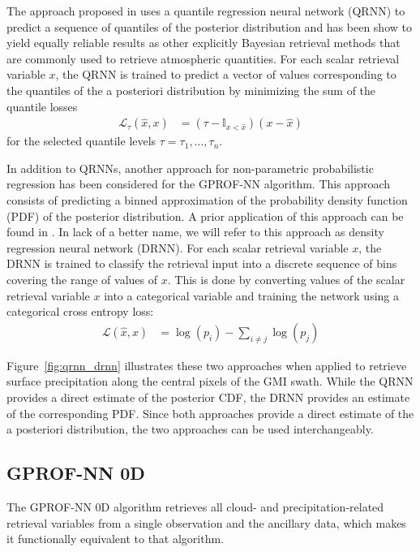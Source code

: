 \documentclass[a4paper,11pt,bibtotoc]{scrartcl}
\begin{document}
The approach proposed in \citet{pfreundschuh18} uses a quantile regression
neural network (QRNN) to predict a sequence of quantiles of the posterior
distribution and has been show to yield equally reliable results as other
explicitly Bayesian retrieval methods that are commonly used to retrieve
atmospheric quantities. For each scalar retrieval variable $x$, the QRNN is
trained to predict a vector of values corresponding to the quantiles of the a
posteriori distribution by minimizing the sum of the quantile losses
\begin{align}
  \mathcal{L}_\tau(\hat{x}, x) &= (\tau - \mathbb{I}_{x < \hat{x}})(x - \hat{x})
\end{align}
for the selected quantile levels $\tau = \tau_1, \ldots, \tau_n$.

In addition to QRNNs, another approach for non-parametric probabilistic
regression has been considered for the GPROF-NN algorithm. This approach
consists of predicting a binned approximation of the probability density
function (PDF) of the posterior distribution. A prior application of this
approach can be found in \cite{metnet}. In lack of a better name, we will refer
to this approach as density regression neural network (DRNN). For each scalar
retrieval variable $x$, the DRNN is trained to classify the retrieval input into
a discrete sequence of bins covering the range of values of $x$. This is done
by converting values of the scalar retrieval variable $x$ into a categorical
variable and training the network using a categorical cross entropy loss:
\begin{align}
  \mathcal{L}(\hat{x}, x) &= \log(p_i) - \sum_{i \neq j}  \log(p_j)
\end{align}

Figure~\ref{fig:qrnn_drnn} illustrates these two approaches when applied to
retrieve surface precipitation along the central pixels of the GMI swath.
While the QRNN provides a direct estimate of the posterior CDF, the DRNN
provides an estimate of the corresponding PDF. Since both approaches provide
a direct estimate of the a posteriori distribution, the two approaches can
be used interchangeably.

\subsection{GPROF-NN 0D}

The GPROF-NN 0D algorithm retrieves all cloud- and precipitation-related
retrieval variables from a single observation and the ancillary data, which
makes it functionally equivalent to that algorithm.
\end{document}
